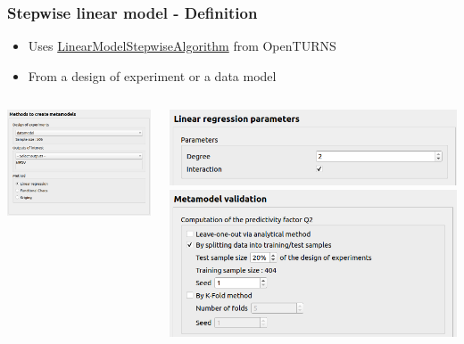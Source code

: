 \documentclass[aspectratio=169]{beamer}
\begin{document}
\begin{frame}
  \frametitle{Stepwise linear model - Definition}
  \begin{itemize}
    \item Uses \url{LinearModelStepwiseAlgorithm} from OpenTURNS
    \item From a design of experiment or a data model
  \end{itemize}

  \begin{columns}

    \begin{center}
      \includegraphics[width=\textwidth]{figures/linearModel1.png}
    \end{center}

    \begin{center}
      \includegraphics[width=\textwidth]{figures/linearModel2.png}
      \includegraphics[width=\textwidth]{figures/linearModel2-1.png}
    \end{center}


\end{columns}
\end{frame}
\end{document}
